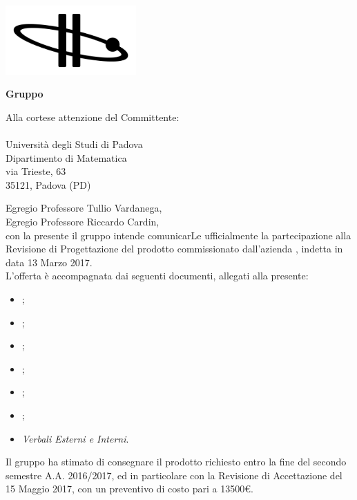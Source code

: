   
\begin{titlepage}
	
	\begin{center}
	 	
	\includegraphics[width=5cm]{../../modello/or-bit_bkg_minBorder.png} 
	\begin{Huge} 
	 	\textbf{Gruppo \GroupName{}}
	\end{Huge}
	\end{center}
	
	\vspace{0,5cm}
	\begin{large}
	\begin{flushright}
		Alla cortese attenzione del Committente: \\
		\Committente \\
		Università degli Studi di Padova \\
		Dipartimento di Matematica \\
		via Trieste, 63 \\
		35121, Padova (PD) 
		
		
	
	\end{flushright}

	\vspace{0,5cm}
	
	Egregio Professore Tullio Vardanega,\\
	Egregio Professore Riccardo Cardin, \\
	
	con la presente il gruppo \GroupName{} intende comunicarLe ufficialmente la partecipazione alla Revisione di Progettazione del prodotto \ProjectName{} commissionato dall'azienda \Proponente{}, indetta in data 13 Marzo 2017.\\	
	
	L'offerta è accompagnata dai seguenti documenti, allegati alla presente:
	\begin{itemize}
		\item \AnalisiDeiRequisiti{};
		\item \Glossario{};
		\item \NormeDiProgetto{};
		\item \PianoDiProgetto{};
		\item \PianoDiQualifica{};
		\item \SpecificaTecnica{};
		\item \emph{Verbali Esterni e Interni}.
	\end{itemize}
	\vspace{0.3cm}
	Il gruppo \GroupName{} ha stimato di consegnare il prodotto richiesto entro la fine del secondo semestre A.A. 2016/2017, ed in particolare con la Revisione di Accettazione del 15 Maggio 2017, con un preventivo di costo pari a 13500€.\\
	

\end{large}
\end{titlepage}
